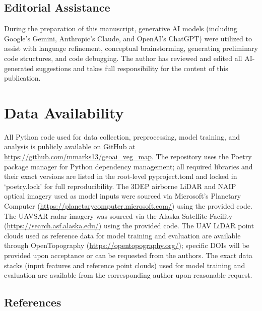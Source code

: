\documentclass[12pt]{report}
\begin{document}
\vspace{-4pt}
\section*{Editorial Assistance}
\vspace{-4pt}

During the preparation of this manuscript, generative AI models (including Google's Gemini, Anthropic's Claude, and OpenAI's ChatGPT) were utilized to assist with language refinement, conceptual brainstorming, generating preliminary code structures, and code debugging. The author has reviewed and edited all AI-generated suggestions and takes full responsibility for the content of this publication.

\chapter*{Data Availability}

All Python code used for data collection, preprocessing, model training, and analysis is publicly available on GitHub at \url{https://github.com/mmarks13/geoai\_veg\_map}. The repository uses the Poetry package manager for Python dependency management; all required libraries and their exact versions are listed in the root-level pyproject.toml and locked in `poetry.lock' for full reproducibility. The 3DEP airborne LiDAR and NAIP optical imagery used as model inputs were sourced via Microsoft's Planetary Computer (\url{https://planetarycomputer.microsoft.com/}) using the provided code. The UAVSAR radar imagery was sourced via the Alaska Satellite Facility (\url{https://search.asf.alaska.edu/}) using the provided code. The UAV LiDAR point clouds used as reference data for model training and evaluation are available through OpenTopography (\url{https://opentopography.org/}); specific DOIs will be provided upon acceptance or can be requested from the authors. The exact data stacks (input features and reference point clouds) used for model training and evaluation are available from the corresponding author upon reasonable request.

\begin{singlespace}
\chapter*{References}

\begingroup
\renewcommand{\chapter}[2]{}%

\endgroup

\end{singlespace}
\end{document}
